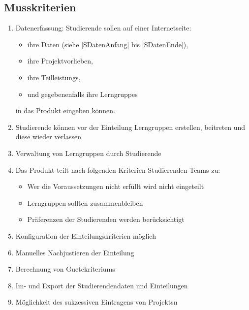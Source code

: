 \documentclass[parskip=full]{scrartcl}
\newcommand{\swtLabel}[1]{\textbf{/#1\arabic*0/}}
\begin{document}
\subsection{Musskriterien}
 \begin{enumerate}[label=\swtLabel{M}]
   \item Datenerfassung: Studierende sollen auf einer Internetseite:   
   \begin{itemize}
     \item ihre Daten (siehe \ref{SDatenAnfang} bis \ref{SDatenEnde}),     
     \item ihre Projektvorlieben, 
     \item ihre \glspl{Teilleistung},
     \item und gegebenenfalls ihre \glspl{Lerngruppe}
   \end{itemize}
   in das Produkt eingeben können.
   \item Studierende können vor der Einteilung Lerngruppen erstellen, beitreten
    und diese wieder verlassen
    \item Verwaltung von Lerngruppen durch Studierende %
   \item Das Produkt teilt nach folgenden Kriterien Studierenden Teams zu:
   \label{Mzuteilung}
   \begin{itemize}
     \item Wer die Voraussetzungen nicht erfüllt wird nicht eingeteilt
     \item Lerngruppen sollten zusammenbleiben
     \item Präferenzen der Studierenden werden berücksichtigt
   \end{itemize}
     \item Konfiguration der Einteilungskriterien möglich
   \item Manuelles Nachjustieren der Einteilung
   \item Berechnung von \glspl{Guetekriterium}
   \item Im- und Export der Studierendendaten und
   Einteilungen %
   \item Möglichkeit des sukzessiven Eintragens von \glspl{Projekt}n
  
 \end{enumerate}
\end{document}
